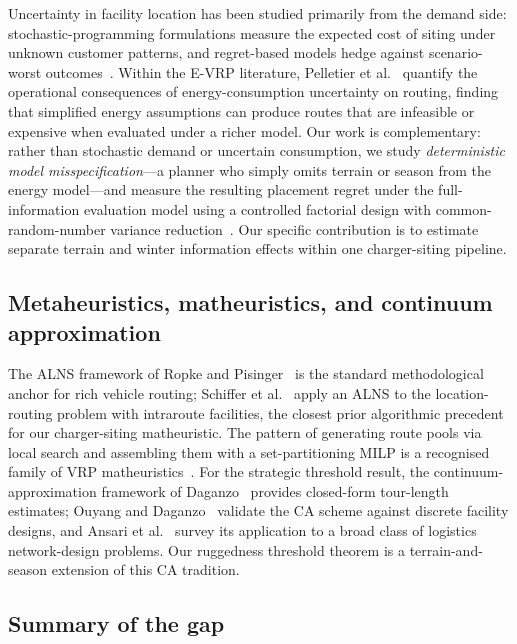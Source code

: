 \documentclass[review,3p,authoryear]{elsarticle}
\begin{document}
Uncertainty in facility location has been studied primarily from the
demand side: stochastic-programming formulations measure the expected cost
of siting under unknown customer patterns, and regret-based models hedge
against scenario-worst outcomes~\citep{Snyder2006}.  Within the E-VRP
literature, Pelletier et al.~\citep{Pelletier2019} quantify the operational consequences of
energy-consumption uncertainty on routing, finding that simplified energy
assumptions can produce routes that are infeasible or expensive when
evaluated under a richer model.  Our work is complementary: rather than
stochastic demand or uncertain consumption, we study \emph{deterministic
model misspecification}---a planner who simply omits terrain or season from
the energy model---and measure the resulting placement regret under the
full-information evaluation model using a controlled factorial design with
common-random-number variance reduction~\citep{Glasserman1992}.
Our specific contribution is to estimate separate terrain and winter
information effects within one charger-siting pipeline.

\subsection{Metaheuristics, matheuristics, and continuum approximation}

The ALNS framework of Ropke and Pisinger~\citep{Ropke2006} is the standard methodological
anchor for rich vehicle routing; Schiffer et al.~\citep{Schiffer2019alns} apply an ALNS
to the location-routing problem with intraroute facilities, the closest
prior algorithmic precedent for our charger-siting matheuristic.  The
pattern of generating route pools via local search and assembling them
with a set-partitioning MILP is a recognised family of VRP
matheuristics~\citep{Archetti2014,Montoya2017}.  For the strategic
threshold result, the continuum-approximation framework of
Daganzo~\citep{Daganzo1984} provides closed-form tour-length estimates;
Ouyang and Daganzo~\citep{Ouyang2006} validate the CA scheme against discrete facility
designs, and Ansari et al.~\citep{Ansari2018} survey its application to a broad class
of logistics network-design problems.  Our ruggedness threshold theorem
is a terrain-and-season extension of this CA tradition.

\subsection*{Summary of the gap}
\end{document}

